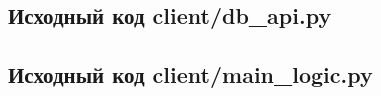 \clearpage
\subsection{Исходный код client/db\_api.py}



\clearpage
\subsection{Исходный код client/main\_logic.py}



\clearpage
{}
\nocite{*}
\printbibliography{}
